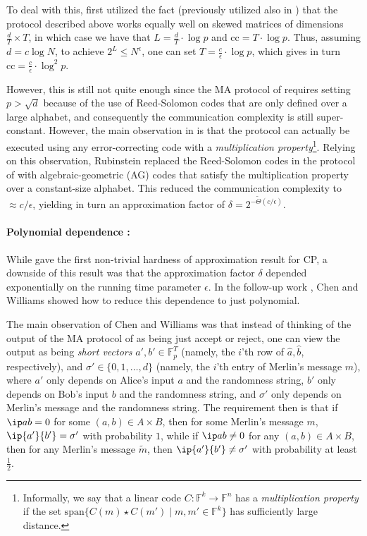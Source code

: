 \documentclass[11pt]{article}
\theoremstyle{plain}
\theoremstyle{remark}
\newcommand{\F}{\mathbb{F}}
\newcommand{\cc}{\mathrm{cc}}
\newcommand{\spn}{\mathrm{span}}
\begin{document}
To deal with this, \cite{Rub18} first utilized the fact (previously utilized also in \cite{ARW17}) that the \cite{AW09} protocol described above works equally well on skewed matrices of dimensions $\frac d T \times T$, in which case we have that $L=\frac d T \cdot \log p$ and $\cc= T \cdot \log p$. 
Thus, assuming $d = c \log N$, to achieve $2^L \leq N^{\epsilon}$, one can set $T = \frac c \epsilon \cdot \log p $, which gives in turn $\cc=\frac c \epsilon \cdot \log ^2p$.

However, this is still not quite enough since the MA protocol of \cite{AW09} requires setting $p >  \sqrt{d}$ because of the use of Reed-Solomon codes that are only defined over a large alphabet, and consequently the communication complexity is still super-constant. However, the main observation in \cite{AW09} is that the protocol can actually be executed using any error-correcting code with a \emph{multiplication property}\footnote{Informally, we say that a linear code $C:\F^k \to \F^n$ has a \emph{multiplication property} if the set $\spn\{C(m) \star C(m') \mid m,m' \in \F^k  \}$ has sufficiently large distance.}. 
Relying on this observation, Rubinstein replaced the Reed-Solomon codes in the protocol of \cite{AW09} with algebraic-geometric (AG) codes that satisfy the multiplication property over a constant-size alphabet.
This reduced the communication complexity to $ \approx c/\epsilon$, yielding in turn an approximation factor of $\delta = 2^{- \tilde \Theta (c/\epsilon)}$. 

\paragraph{Polynomial dependence \cite{CW19}:}

While \cite{Rub18} gave the first non-trivial hardness of approximation result for CP, a downside of this result was that the approximation factor $\delta$ depended exponentially on the running time parameter $\epsilon$. In the follow-up work \cite{CW19}, Chen and Williams showed how to reduce this dependence to just polynomial.

The main observation of Chen and Williams was that instead of thinking of the output of the MA protocol of  \cite{Rub18} as being just accept or reject, one can view the output as being \emph{short vectors} $a',b' \in \F_p^T$ (namely, the $i$'th row of $\hat a, \hat b$, respectively), and $\sigma' \in \{0,1,\ldots, d\}$ (namely, the $i$'th entry of Merlin's message $m$), where $a'$ only depends on Alice's input $a$ and the randomness string, $b'$ only depends on Bob's input $b$ and the randomness string, and $\sigma'$ only depends on Merlin's message and the randomness string. The requirement then is that if $\ip a b =0$ for some $(a,b) \in A \times B$,
then for some Merlin's message $m$,
$\ip {a'} {b'} = \sigma'$ with probability $1$, while if $\ip a b \neq 0$ for any $(a,b) \in A \times B$,
then for any Merlin's message $\tilde m$,
then $\ip {a'} {b'} \neq \sigma'$ with probability at least $\frac 1 2$. 
\end{document}
